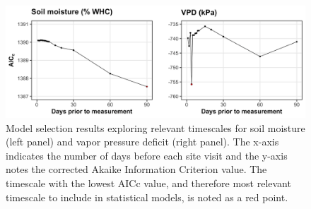 \newpage
\begin{landscape}
    \begin{figure}
        \centering
        \includegraphics[width=\linewidth]{ch4_TXeco/figs/TXeco_figS2_aicc.png}
        \caption[Model selection results exploring relevant timescales for soil moisture and vapor pressure deficit]{Model selection results exploring relevant timescales for soil moisture (left panel) and vapor pressure deficit (right panel). The x-axis indicates the number of days before each site visit and the y-axis notes the corrected Akaike Information Criterion value. The timescale with the lowest AICc value, and therefore most relevant timescale to include in statistical models, is noted as a red point.}
        \label{fig:figure.c1}
    \end{figure}
\end{landscape}
\clearpage


